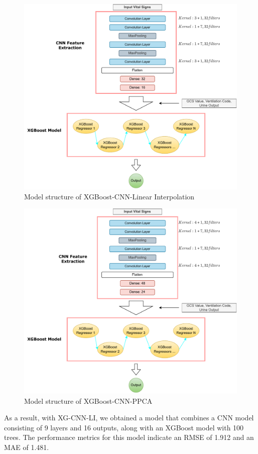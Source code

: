 \documentclass[12pt,a4paper,english
]{tunithesis}
\begin{document}
\begin{figure}
  \begin{center}
    \includegraphics[width=1\textwidth]{thesis/img/xg_cnn_li.pdf}
  \end{center}
  \caption[XGBoost-CNN-LI model]{Model structure of XGBoost-CNN-Linear Interpolation}
  \label{fig:xg_cnn_li_struc}
\end{figure}

\begin{figure}
  \begin{center}
    \includegraphics[width=1\textwidth]{thesis/img/xg_cnn_ppca.pdf}
  \end{center}
  \caption[XGBoost-CNN-PPCA model]{Model structure of XGBoost-CNN-PPCA}
  \label{fig:xg_cnn_ppca_struc}
\end{figure}
As a result, with XG-CNN-LI, we obtained a model that combines a CNN model consisting of 9 layers and 16 outputs, along with an XGBoost model with 100 trees. The performance metrics for this model indicate an RMSE of 1.912 and an MAE of 1.481.
\end{document}
